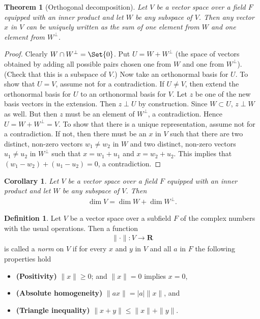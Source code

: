 \documentclass[]{article}
\theoremstyle{plain}
\newtheorem{thm}{Theorem}
\newtheorem*{cor}{Corollary}
\theoremstyle{definition}
\newtheorem{defn}{Definition}
\theoremstyle{remark}
\newcommand{\reals}{\mathbf{R}}
\begin{document}
\begin{thm}[Orthogonal decomposition]
Let $V$ be a vector space over a field $F$ equipped with an inner product
and let $W$ be any subspace of $V$. Then
any vector $x$ in $V$ can be uniquely written as the sum of one element
from $W$ and one element from $W^\perp$.
\end{thm}
\begin{proof}
Clearly $W \cap W^\perp = \Set{0}$. Put $U = W + W^\perp$ (the space of
vectors obtained by adding all possible pairs chosen one from $W$ and
one from $W^\perp$). (Check that this is a subspace of $V$.)  Now take
an orthonormal basis for $U$. To show that $U = V$, assume not for a
contradiction.  If $U \ne V$, then extend the orthonormal basis for
$U$ to an orthonormal basis for $V$.  Let $z$ be one of the new basis
vectors in the extension.  Then $z \perp U$ by construction.  Since
$W \subset U$, $z \perp W$ as well.  But then $z$ must be an element
of $W^\perp$, a contradiction.  Hence $U = W + W^\perp = V$.  To show
that there is a unique representation, assume not for a contradiction.
If not, then there must be an $x$ in $V$ such that there are two
distinct, non-zero vectors $w_1 \ne w_2$ in $W$ and two 
distinct, non-zero vectors $u_1 \ne u_2$ in $W^\perp$ such that
$x = w_1 + u_1$ and $x = w_2 + u_2$.  This implies that
$(w_1 - w_2) + (u_1 - u_2) = 0$, a contradiction.
\end{proof}

\begin{cor}
Let $V$ be a vector space over a field $F$ equipped with an inner product
and let $W$ be any subspace of $V$. Then
\begin{align*}
\dim{V} = \dim{W} + \dim{W^\perp}.
\end{align*}
\end{cor}

\begin{defn}
Let $V$ be a vector space over a subfield $F$ of the complex numbers with the
usual operations.  Then a function
\begin{align*} 
\|\cdot\| : V \to \reals
\end{align*}
is called a
\emph{norm} on $V$ if for every $x$ and $y$ in $V$ and all $a$ in $F$ the
following properties hold
\begin{itemize}
\item \textbf{(Positivity)} $\|x\| \ge 0$;  and $\|x\| = 0$ implies $x=0$,
\item \textbf{(Absolute homogeneity)} $\|ax\| = |a|\|x\|$, and
\item \textbf{(Triangle inequality)} $\|x + y\| \le \|x\| + \|y\|$.
\end{itemize}
\end{defn}
\end{document}
